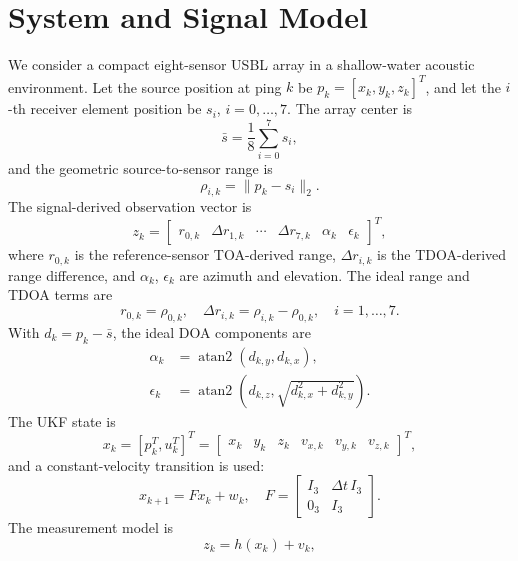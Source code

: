 \documentclass[journal]{IEEEtran}
\begin{document}
\section{System and Signal Model}
We consider a compact eight-sensor USBL array in a shallow-water acoustic environment. Let the
source position at ping $k$ be $p_k=[x_k,y_k,z_k]^{T}$, and let the $i$-th receiver element
position be $s_i$, $i=0,\ldots,7$. The array center is
\begin{equation}
\bar{s}=\frac{1}{8}\sum_{i=0}^{7}s_i,
\end{equation}
and the geometric source-to-sensor range is
\begin{equation}
\rho_{i,k}=\|p_k-s_i\|_2 .
\end{equation}
The signal-derived observation vector is
\begin{equation}
z_k =
\begin{bmatrix}
r_{0,k} & \Delta r_{1,k} & \cdots & \Delta r_{7,k} & \alpha_k & \epsilon_k
\end{bmatrix}^{T},
\end{equation}
where $r_{0,k}$ is the reference-sensor TOA-derived range, $\Delta r_{i,k}$ is the TDOA-derived
range difference, and $\alpha_k$, $\epsilon_k$ are azimuth and elevation. The ideal range and
TDOA terms are
\begin{equation}
r_{0,k}=\rho_{0,k},\quad \Delta r_{i,k}=\rho_{i,k}-\rho_{0,k},\quad i=1,\ldots,7.
\end{equation}
With $d_k=p_k-\bar{s}$, the ideal DOA components are
\begin{align}
\alpha_k &=\operatorname{atan2}(d_{k,y},d_{k,x}),\\
\epsilon_k &=\operatorname{atan2}\!\left(d_{k,z},\sqrt{d_{k,x}^2+d_{k,y}^2}\right).
\end{align}
The UKF state is
\begin{equation}
x_k=[p_k^{T},u_k^{T}]^{T}
=\begin{bmatrix} x_k & y_k & z_k & v_{x,k} & v_{y,k} & v_{z,k} \end{bmatrix}^{T},
\end{equation}
and a constant-velocity transition is used:
\begin{equation}
x_{k+1}=Fx_k+w_k,\quad
F=\begin{bmatrix} I_3 & \Delta t\, I_3 \\ 0_3 & I_3 \end{bmatrix}.
\end{equation}
The measurement model is
\begin{equation}
z_k=h(x_k)+v_k,
\end{equation}
\end{document}
